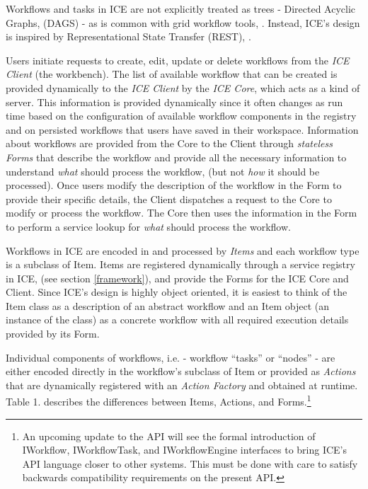 Workflows and tasks in ICE are not explicitly treated as trees -
Directed Acyclic Graphs, (DAGS) - as is common with grid workflow tools,
\cite{yu_taxonomy_2005}. Instead, ICE's design is inspired by Representational
State Transfer (REST), \cite{fielding_architectural_2000}.

Users initiate requests to create, edit, update or delete workflows from
the \emph{ICE Client} (the workbench). The list of available workflow
that can be created is provided dynamically to the \emph{ICE Client} by
the \emph{ICE Core}, which acts as a kind of server. This information is
provided dynamically since it often changes as run time based on the
configuration of available workflow components in the registry and on
persisted workflows that users have saved in their workspace.
Information about workflows are provided from the Core to the Client
through \emph{stateless Forms} that describe the workflow and provide
all the necessary information to understand \emph{what} should process
the workflow, (but not \emph{how} it should be processed). Once users
modify the description of the workflow in the Form to provide their
specific details, the Client dispatches a request to the Core to modify
or process the workflow. The Core then uses the information in the Form
to perform a service lookup for \emph{what} should process the workflow.

Workflows in ICE are encoded in and processed by \emph{Items} and each
workflow type is a subclass of Item. Items are registered dynamically
through a service registry in ICE, (see section \ref{framework}), and
provide the Forms for the ICE Core and Client. Since ICE's design is
highly object oriented, it is easiest to think of the Item class as a
description of an abstract workflow and an Item object (an instance of
the class) as a concrete workflow with all required execution details
provided by its Form.

Individual components of workflows, i.e. - workflow ``tasks'' or
``nodes'' - are either encoded directly in the workflow's subclass of
Item or provided as \emph{Actions} that are dynamically registered with
an \emph{Action Factory} and obtained at runtime. Table 1. describes the
differences between Items, Actions, and Forms.\footnote{An upcoming update to the API will see the formal introduction of
IWorkflow, IWorkflowTask, and IWorkflowEngine interfaces to bring ICE's
API language closer to other systems. This must be done with care to
satisfy backwards compatibility requirements on the present API.}

